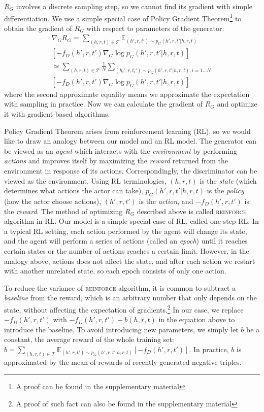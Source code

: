 \documentclass[11pt,a4paper]{article}
\begin{document}
$R_G$ involves a discrete sampling step, so we cannot find its gradient with simple differentiation. We use a simple special case of Policy Gradient Theorem\footnote{A proof can be found in the supplementary material} \cite{policygradient} to obtain the gradient of $R_G$ with respect to parameters of the generator:
\begin{multline}
\nabla_G R_G=\sum_{(h,r,t)\in\mathcal{T}}\mathbb{E}_{(h',r,t')\sim p_G(h',r,t'|h,r,t)} \\
[-f_D(h',r,t')\nabla_G \log p_G(h',r,t'|h,r,t)] \\
\simeq \sum_{(h,r,t)\in\mathcal{T}}\frac{1}{N}\sum_{(h_i',r,t_i')\sim p_G(h',r,t'|h,r,t), i=1\dots N} \\
[-f_D(h',r,t')\nabla_G \log p_G(h',r,t'|h,r,t)]
\end{multline}
where the second approximate equality means we approximate the expectation with sampling in practice. Now we can calculate the gradient of $R_G$ and optimize it with gradient-based algorithms.

Policy Gradient Theorem arises from reinforcement learning (RL), so we would like to draw an analogy between our model and an RL model. The generator can be viewed as an \emph{agent} which interacts with the \emph{environment} by performing \emph{actions} and improves itself by maximizing the \emph{reward} returned from the environment in response of its actions. Correspondingly, the discriminator can be viewed as the environment. Using RL terminologies, $(h,r,t)$ is the \emph{state} (which determines what actions the actor can take), $p_G(h',r,t'|h,r,t)$ is the \emph{policy} (how the actor choose actions), $(h',r,t')$ is the \emph{action}, and $-f_D(h',r,t')$ is the \emph{reward}. The method of optimizing $R_G$ described above is called \textsc{reinforce}~\cite{williams1992simple} algorithm in RL. Our model is a simple special case of RL, called one-step RL. In a typical RL setting, each action performed by the agent will change its state, and the agent will perform a series of actions (called an \emph{epoch}) until it reaches certain states or the number of actions reaches a certain limit. However, in the analogy above, actions does not affect the state, and after each action we restart with another unrelated state, so each epoch consists of only one action.

To reduce the variance of \textsc{reinforce} algorithm, it is common to subtract a \emph{baseline} from the reward, which is an arbitrary number that only depends on the state, without affecting the expectation of gradients.\footnote{A proof of such fact can also be found in the supplementary material} In our case, we replace $-f_D(h',r,t')$ with $-f_D(h',r,t')-b(h,r,t)$ in the equation above to introduce the baseline. To avoid introducing new parameters, we simply let $b$ be a constant, the average reward of the whole training set: $b=\sum_{(h,r,t)\in\mathcal{T}}\mathbb{E}_{(h',r,t')\sim p_G(h',r,t'|h,r,t)}[-f_D(h',r,t')]$. In practice, $b$ is approximated by the mean of rewards of recently generated negative triples.
\end{document}
